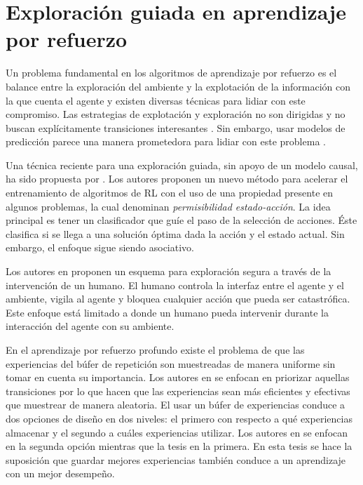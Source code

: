 \section{Exploración guiada en aprendizaje por refuerzo}

Un problema fundamental en los algoritmos de aprendizaje por refuerzo
es el balance entre la exploración del ambiente y la explotación
de la información con la que cuenta el agente y existen diversas técnicas para lidiar con este compromiso.
Las estrategias de explotación y exploración no 
son dirigidas y no buscan explícitamente transiciones
interesantes \cite{mcfarlane2018survey}.
Sin embargo, usar modelos de predicción parece una manera 
prometedora para lidiar con este problema \cite{hafner2019dream}.

 
Una técnica reciente para una exploración 
guiada, sin apoyo de un modelo causal, ha sido
propuesta por \cite{mazumder2019guided}.
Los autores proponen un nuevo método
para acelerar el entrenamiento de algoritmos de RL con el uso de una propiedad presente
en algunos problemas, la cual denominan \textit{permisibilidad estado-acción}.
La idea principal es tener un clasificador
que guíe el paso de la selección de acciones. Éste clasifica si se llega
a una solución óptima dada la acción y el
estado actual. Sin embargo, el enfoque sigue siendo
asociativo.

Los autores en \cite{saunders2017trial} proponen un esquema 
para exploración segura a través de la intervención de un humano. El humano controla la interfaz entre el agente y el ambiente, vigila
al agente y bloquea cualquier acción que pueda ser catastrófica. Este enfoque
está limitado a donde un humano pueda intervenir durante la interacción 
del agente con su ambiente.

En el aprendizaje por refuerzo profundo existe el problema de que las experiencias del búfer de repetición son muestreadas de manera uniforme sin tomar en cuenta su importancia. Los autores en \cite{schaul2015prioritized}  se enfocan en priorizar aquellas transiciones por lo que hacen que las experiencias sean más eficientes y efectivas que muestrear de manera aleatoria. El usar un búfer de experiencias conduce a dos opciones de diseño en dos niveles: el primero con respecto a qué experiencias almacenar y el segundo a cuáles experiencias utilizar. Los autores en \cite{schaul2015prioritized} se enfocan en la segunda opción mientras que la tesis en la primera. En esta tesis se hace la suposición que guardar mejores experiencias también conduce a un aprendizaje con un mejor desempeño.

